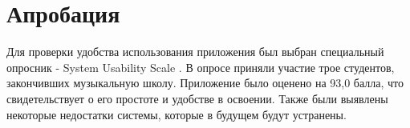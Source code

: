 \chapter{Апробация}
Для проверки удобства использования приложения был выбран специальный опросник - System Usability Scale \cite{brooke1996sus}. В опросе приняли участие трое студентов, закончивших музыкальную школу. Приложение было оценено на 93,0 балла, что свидетельствует о его простоте и удобстве в освоении. Также были выявлены некоторые недостатки системы, которые в будущем будут устранены.